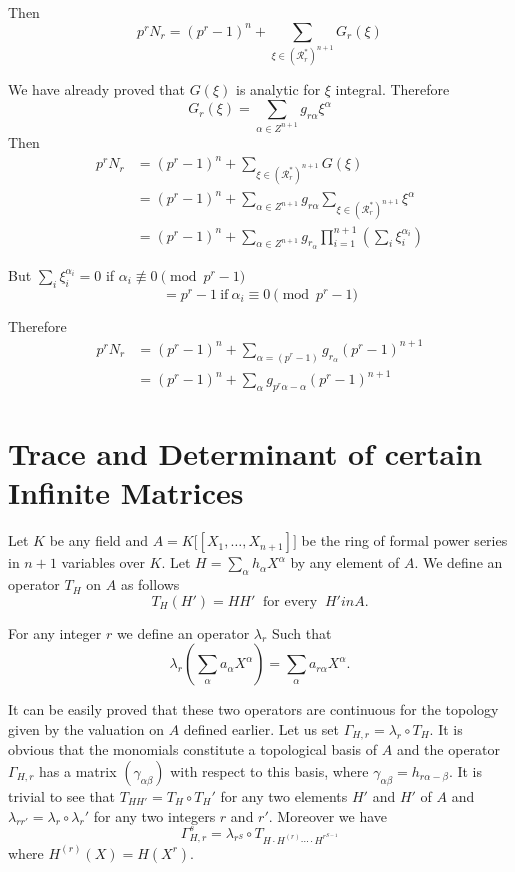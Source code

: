 Then
$$
p^r N_r = (p^r -1)^n + \sum_{\xi \in (\mathscr{R}_r^*)^{n+1}} G_r(\xi)  
$$
 
We have already proved that $G(\xi)$ is analytic for $\xi$
integral. Therefore  
$$
G_r(\xi) = \sum_{\alpha \in Z^{n+1}} g_{r\alpha} \xi^{\alpha}
$$
Then
\begin{align*}
  p^r N_r & = (p^r -1)^n + \sum_{\xi \in (\mathscr{R}_r^*)^{n+1}} G(\xi)\\
  & = (p^r -1)^n + \sum_{\alpha \in Z^{n+1}} g_{r \alpha} \sum_{\xi
    \in (\mathscr{R}_r^*)^{n+1}} \xi^{\alpha}\\ 
  & = (p^r-1)^n + \sum_{\alpha \in Z^{n+1}} g_{r_\alpha}
  \prod^{n+1}_{i=1}\left(\sum_i \xi^{\alpha_i}_{i}\right)  
\end{align*}

But $\sum\limits_{i} \xi_{i}^{\alpha_i}=0$ if $\alpha_i \not \equiv 0
\pmod {p^r-1}$ 
$$
= p^r -1 ~\text{if}~ \alpha_i \equiv 0 \pmod {p^r-1}
$$

Therefore
\begin{align*}
  p^r N_r &= (p^r-1)^n +  \sum_{\alpha = (p^r-1)} g_{r_{\alpha}} (p^r-1)^{n+1}\\
  &= (p^r-1)^n +  \sum_{\alpha} g_{p^r \alpha - \alpha } (p^r
  -1)^{n+1}  \tag{I}\label{part3:chap2:sec8:eqI} 
\end{align*}\pageoriginale

\section{Trace and Determinant of certain Infinite
  Matrices}\label{part3:chap2:sec9} 

Let  $K$ be any field and  $ A = K \bigg[ [ X_1, \ldots , X_{n+1}]\bigg]$ be the ring of formal power series in $n+1$ 
variables over $K$. Let $ H= \sum\limits_{\alpha} h_{\alpha} X^{\alpha}$ by any element of $A$. We define  an operator $T_H$ on $A$ as
follows   
$$
T_H (H') =  H H' ~\text{ for every }~ H' in A.
$$

For any integer $r$ we  define  an operator $\lambda_{r}$ Such that 
$$
\lambda_r \left(\sum_\alpha a_\alpha  X^\alpha\right) = \sum_{\alpha} a_{r
  \alpha} X^\alpha. 
$$

It can be easily proved that these two operators are continuous for
the topology given by the valuation on $A$ defined earlier. Let us set
$\Gamma_{H, r} = \lambda_r \circ T_H$. It is obvious that the  monomials
constitute a topological basis of $A$ and the operator $\Gamma _{H,r}$
has a matrix $(\gamma _{\alpha \beta})$ with respect to this basis,
where $\gamma_{\alpha \beta} = h_{r \alpha -\beta}$. It is trivial to
see that $T_{H H'}= T_H \circ T_H'$ for any two elements $H'$ and $H'$  of
$A$ and $\lambda_{r r'} = \lambda_r \circ \lambda_r'$ for any two integers
$r$ and $r'$. Moreover we have  
$$
\Gamma^{s}_{H,r} = \lambda_{r^{S}} \circ T_{H\cdot  H^{(r)} \cdots \cdot H^{r^{S-1}}}
$$
where $H^{(r)} (X) = H(X^r)$.

